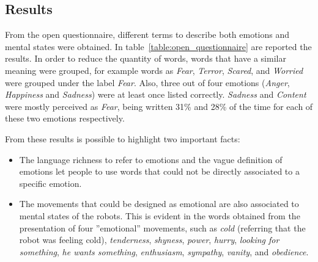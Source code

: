 \subsection{Results}

From the open questionnaire, different terms to describe both emotions and mental states were obtained. In table~\ref{table:open_questionnaire} are reported the results. In order to reduce the quantity of words, words that have a similar meaning were grouped, for example words as \textit{Fear}, \textit{Terror}, \textit{Scared}, and \textit{Worried} were grouped under the label \textit{Fear}. Also, three out of four emotions (\textit{Anger}, \textit{Happiness} and \textit{Sadness}) were at least once listed correctly. \textit{Sadness} and \textit{Content} were mostly perceived as \textit{Fear}, being written 31\% and 28\% of the time for each of these two emotions respectively.

From these results is possible to highlight two important facts:

\begin{itemize}
	
	\item The language richness to refer to emotions and the vague definition of emotions let people to use words that could not be directly associated to a specific emotion. 
	
	\item The movements that could be designed as emotional are also associated to mental states of the robots. This is evident in the words obtained from the presentation of four ''emotional'' movements, such as \textit{cold} (referring that the robot was feeling cold), \textit{tenderness}, \textit{shyness}, \textit{power}, \textit{hurry}, \textit{looking for something}, \textit{he wants something}, \textit{enthusiasm}, \textit{sympathy}, \textit{vanity}, and \textit{obedience}. 
	
\end{itemize}

